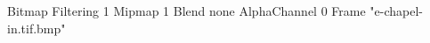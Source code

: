 {Bitmap
	{Filtering 1}
	{Mipmap 1}
	{Blend none}
	{AlphaChannel 0}
	{Frame "e-chapel-in.tif.bmp"}
}
